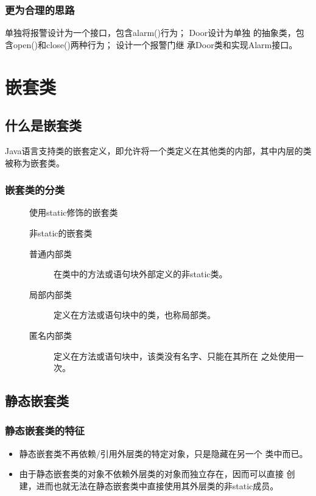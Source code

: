 \subsubsection{更为合理的思路} 

 单独将报警设计为一个接口，包含alarm()行为； Door设计为单独
的抽象类，包含open()和close()两种行为； 设计一个报警门继
承Door类和实现Alarm接口。


\section{嵌套类}

\subsection{什么是嵌套类}

Java语言支持类的嵌套定义，即允许将一个类定义在其他类的内部，其中内层的类被称为嵌套类。

\subsubsection{嵌套类的分类}

\begin{description}
\item[] 使用static修饰的嵌套类
\item[] 非static的嵌套类
  \begin{description}
  \item[普通内部类] 在类中的方法或语句块外部定义的非static类。
  \item[局部内部类] 定义在方法或语句块中的类，也称局部类。
  \item[匿名内部类] 定义在方法或语句块中，该类没有名字、只能在其所在
    之处使用一次。
  \end{description}
\end{description}

\subsection{静态嵌套类}

\subsubsection{静态嵌套类的特征}

\begin{itemize}
\item {\hei 静态嵌套类不再依赖/引用外层类的特定对象，只是隐藏在另一个
    类中而已。}
\item 由于静态嵌套类的对象不依赖外层类的对象而独立存在，因而可以直接
  创建，进而也就无法在静态嵌套类中直接使用其外层类的非static成员。
\end{itemize}

